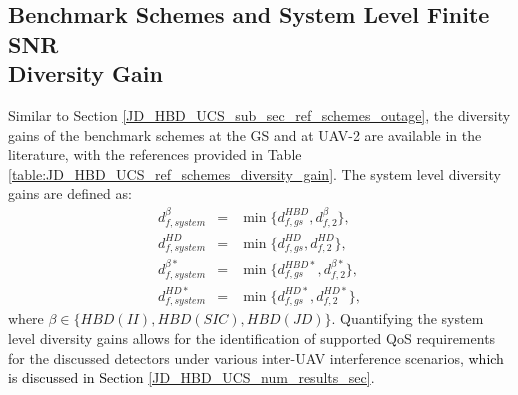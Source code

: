 \subsection{Benchmark Schemes and System Level Finite SNR \\ Diversity Gain}
\begin{table}[]
\centering
\caption{References for the finite SNR diversity gains of the benchmark schemes}
\label{table:JD_HBD_UCS_ref_schemes_diversity_gain}
 \vspace{-0.5cm}
\end{table}

Similar to Section \ref{JD_HBD_UCS_sub_sec_ref_schemes_outage}, the diversity gains of the benchmark schemes at the GS and at UAV-2 are available in the literature, with the references provided in Table \ref{table:JD_HBD_UCS_ref_schemes_diversity_gain}. The system level diversity gains are defined as:
\begin{eqnarray}
d_{f,system}^{\beta} & = & \min\big\{ d_{f,gs}^{HBD},d_{f,2}^{\beta} \big\}, \\
d_{f,system}^{HD} & = & \min\big\{ d_{f,gs}^{HD},d_{f,2}^{HD} \big\}, \\
d_{f,system}^{\beta*} & = & \min\big\{ d_{f,gs}^{HBD*}, d_{f,2}^{\beta*} \big\}, \\
d_{f,system}^{HD*} & = & \min\big\{ d_{f,gs}^{HD*}, d_{f,2}^{HD*} \big\},
\end{eqnarray}
where $\beta \in \{HBD(II), HBD(SIC), HBD(JD)\}$. Quantifying the system level diversity gains allows for the identification of supported QoS requirements for the discussed detectors under various inter-UAV interference scenarios, \textcolor{black}{which is discussed in Section \ref{JD_HBD_UCS_num_results_sec}}.

